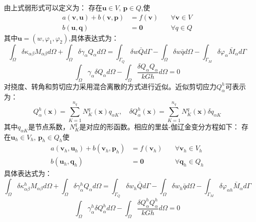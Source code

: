 由上式弱形式可以定义为：
存在$\boldsymbol u \in V$, $\boldsymbol p \in Q$,使
\begin{equation}
    \begin{aligned}
        a(\boldsymbol v, \boldsymbol u) + b(\boldsymbol v, \boldsymbol p) &= f(\boldsymbol v) \quad &\forall \boldsymbol v \in V \\
        b(\boldsymbol u, \boldsymbol q) &= \boldsymbol 0 \quad &\forall q \in Q
    \end{aligned}
\end{equation}
其中$\boldsymbol u=(w,\varphi_1,\varphi_2)$,具体表达式为：
\begin{equation}\label{mindlin_weak1}
    \int_{\Omega}\delta\kappa_{\alpha \beta}M_{\alpha \beta}d\Omega+\int_{\Omega}\delta\gamma_{\alpha}Q_{\alpha}d\Omega=\int_{\Gamma_{Q}}\delta{w}{\bar Q}d\Gamma-\int_{\Omega} \delta{w}\bar{q}d\Omega-\int_{\Gamma_{M}}\delta\varphi_{\alpha}{{\bar M}_{\alpha}}d\Gamma
\end{equation}
\begin{equation}\label{mindlin_weak2}
    \int_{\Omega}\gamma_{\alpha}\delta{Q}_{\alpha}d\Omega-\int_{\Omega}\frac{\delta{Q}_{\alpha}{Q}_{\alpha}}{kGh}d\Omega=0
\end{equation}
对挠度、转角和剪切应力采用混合离散的方式进行近似。近似剪切应力$Q_\alpha^h$可表示为：
\begin{equation}\label{Q_h}
    Q^h_\alpha(\boldsymbol x) = \sum_{K=1}^{n_q} N^q_K(\boldsymbol x) q_{\alpha K},\quad \delta Q^h_\alpha(\boldsymbol x) = \sum_{K=1}^{n_q} N^q_K(\boldsymbol x) \delta q_{\alpha K}
\end{equation}
其中$q_{\alpha K}$是节点系数，$N^q_K$是对应的形函数。相应的里兹-伽辽金变分方程如下：
存在$\boldsymbol u_h \in V_h$, $\boldsymbol p_h \in Q_h$使
\begin{equation}
    \begin{aligned}
        a(\boldsymbol v_h, \boldsymbol u_h) + b(\boldsymbol v_h, \boldsymbol p_h) &= f(\boldsymbol v_h) \quad &\forall \boldsymbol v_h \in V_h \\
        b(\boldsymbol u_h, \boldsymbol q_h) &= \boldsymbol 0 \quad &\forall \boldsymbol q_h \in Q_h
    \end{aligned}
\end{equation}
具体表达式为：
\begin{equation}\label{mindlin_ritz1}
    \int_{\Omega}\delta\kappa^h_{\alpha \beta}M_{\alpha \beta}d\Omega+\int_{\Omega}\delta\gamma^h_{\alpha}Q_{\alpha}d\Omega=\int_{\Gamma_{Q}}\delta{w_h}{\bar Q}d\Gamma-\int_{\Omega} \delta{w_h}\bar{q}d\Omega-\int_{\Gamma_{M}}\delta\varphi_{\alpha h}{{\bar M}_{\alpha}}d\Gamma
\end{equation}
\begin{equation}\label{mindlin_ritz2}
    \int_{\Omega}\gamma^h_{\alpha}\delta{Q}^h_{\alpha}d\Omega-\int_{\Omega}\frac{\delta{Q}^h_{\alpha}{Q}^h_{\alpha}}{kGh}d\Omega=0
\end{equation}

